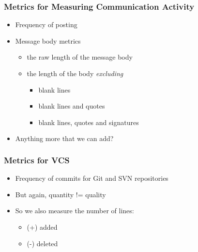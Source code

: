 \documentclass[compress]{beamer}
\begin{document}
\begin{frame}
 \frametitle{Metrics for Measuring Communication Activity}
 \begin{itemize}
    \item Frequency of posting 
    \pause
    \item Message body metrics 
    \begin{itemize}
        \item the raw length of the message body
        \pause
        \item the length of the body \textit{excluding}
        \begin{itemize}
            \item blank lines
            \pause
            \item blank lines and quotes
            \pause
            \item blank lines, quotes and signatures
            \pause
        \end{itemize}
    \end{itemize}
    \pause
    \item Anything more that we can add? 
 \end{itemize}
\end{frame}

\begin{frame}
    \frametitle{Metrics for VCS}
    \begin{itemize}
        \item Frequency of commits for Git and SVN repositories
        \pause
        \item But again, quantity != quality
        \pause
        \item So we also measure the number of lines:
        \begin{itemize}
            \item (+) added
            \item (-) deleted
        \end{itemize}
    \end{itemize}
\end{frame}
\end{document}
